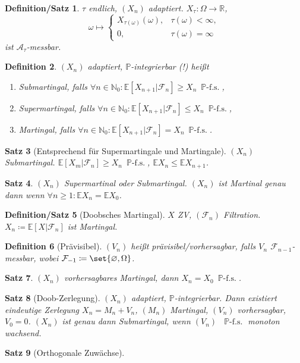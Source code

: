 \documentclass[a4paper,8pt]{article}
\newcounter{Sec}
\theoremstyle{nonumberbreak}
\newtheorem{definition}{Definition}[Sec]
\newtheorem{satz}[definition]{Satz}
\newtheorem{defsatz}[definition]{Definition/Satz}
\newcommand{\defas}{\coloneqq}
\renewcommand{\P}{\mathbb{P}}
\newcommand{\R}{\mathbb{R}}
\newcommand{\F}{\mathcal{F}}
\newcommand{\E}{\mathbb{E}}
\newcommand{\EV}[2]{\E[#1|#2]}
\newcommand{\N}{\mathbb{N}}
\newcommand{\fs}[1]{~\operatorname{#1-f.s.}}
\begin{document}
\begin{multicols}{3}
	\begin{defsatz}
		$\tau$ endlich, $(X_n)$ adaptiert. $X_\tau\colon\Omega\to\R$,
		\[
			\omega\mapsto\begin{cases}
				X_{\tau(\omega)}(\omega), &\tau(\omega)<\infty,\\
				0, &\tau(\omega)=\infty
			\end{cases}
		\]
		ist $\mathcal{A}_\tau$-messbar.
	\end{defsatz}
	\begin{definition}
		$(X_n)$ adaptiert, $\P$-integrierbar (!) heißt
		\begin{enumerate}[label=(\alph*)]
			\item Submartingal, falls $\forall n\in\N_0:\EV{X_{n+1}}{\F_n}\geq X_n\fs{\P}$,
			\item Supermartingal, falls $\forall n\in\N_0:\EV{X_{n+1}}{\F_n}\leq X_n\fs{\P}$,
			\item Martingal, falls $\forall n\in\N_0:\EV{X_{n+1}}{\F_n} = X_n\fs{\P}$.
		\end{enumerate}
	\end{definition}
	\begin{satz}[Entsprechend für Supermartingale und Martingale]
		$(X_n)$ Submartingal. $\EV{X_m}{\F_n}\geq X_n\fs\P$, $\E X_n\leq \E X_{n+1}$.
	\end{satz}
	\begin{satz}
		$(X_n)$ Supermartinal oder Submartingal. $(X_n)$ ist Martinal genau dann wenn
		$\forall n\geq 1:\E X_n = \E X_0$.
	\end{satz}
	\begin{defsatz}[Doobsches Martingal]
		$X$ ZV, $(\F_n)$ Filtration. $X_n\defas\EV{X}{\F_n}$ ist Martingal.
	\end{defsatz}
	\begin{definition}[Prävisibel]
		$(V_n)$ heißt prävisibel/vorhersagbar, falls $V_n$ $\F_{n-1}$-messbar,
		wobei $\F_{-1}\defas\set{\varnothing,\Omega}$.
	\end{definition}
	\begin{satz}
		$(X_n)$ vorhersagbares Martingal, dann $X_n=X_0\fs\P$.
	\end{satz}
	\begin{satz}[Doob-Zerlegung]
		$(X_n)$ adaptiert, $\P$-integrierbar. Dann existiert eindeutige Zerlegung
		$X_n=M_n+V_n$, $(M_n)$ Martingal, $(V_n)$ vorhersagbar, $V_0=0$.
		$(X_n)$ ist genau dann Submartingal, wenn $(V_n)$ $\fs\P$ monoton wachsend.
	\end{satz}
	\begin{satz}[Orthogonale Zuwächse]

\end{satz}
\end{multicols}
\end{document}
